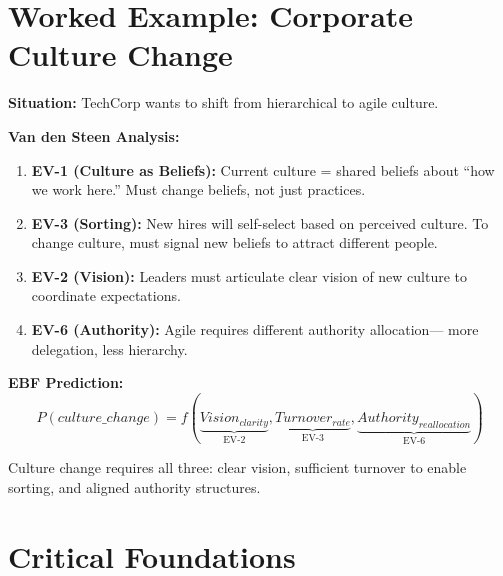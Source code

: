 \section{Worked Example: Corporate Culture Change}

\begin{tcolorbox}[colback=green!5!white, colframe=green!75!black,
    title=Example: Culture Transformation at ``TechCorp'']

\textbf{Situation:} TechCorp wants to shift from hierarchical to agile culture.

\textbf{Van den Steen Analysis:}
\begin{enumerate}
    \item \textbf{EV-1 (Culture as Beliefs):} Current culture = shared beliefs
    about ``how we work here.'' Must change beliefs, not just practices.

    \item \textbf{EV-3 (Sorting):} New hires will self-select based on perceived
    culture. To change culture, must signal new beliefs to attract different people.

    \item \textbf{EV-2 (Vision):} Leaders must articulate clear vision of new
    culture to coordinate expectations.

    \item \textbf{EV-6 (Authority):} Agile requires different authority allocation---
    more delegation, less hierarchy.
\end{enumerate}

\textbf{EBF Prediction:}
\begin{equation}
P(culture\_change) = f(\underbrace{Vision_{clarity}}_{\text{EV-2}},
\underbrace{Turnover_{rate}}_{\text{EV-3}},
\underbrace{Authority_{reallocation}}_{\text{EV-6}})
\end{equation}

Culture change requires all three: clear vision, sufficient turnover to enable
sorting, and aligned authority structures.

\end{tcolorbox}

\section{Critical Foundations}

